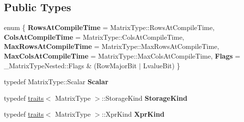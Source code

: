 \subsection*{Public Types}
\begin{DoxyCompactItemize}
\item 
\mbox{\label{struct_eigen_1_1internal_1_1traits_3_01_reverse_3_01_matrix_type_00_01_direction_01_4_01_4_a7819d7c8ce2baa03169cc94ffac98492}} 
enum \{ \newline
{\bfseries Rows\+At\+Compile\+Time} = Matrix\+Type\+::Rows\+At\+Compile\+Time, 
{\bfseries Cols\+At\+Compile\+Time} = Matrix\+Type\+::Cols\+At\+Compile\+Time, 
{\bfseries Max\+Rows\+At\+Compile\+Time} = Matrix\+Type\+::Max\+Rows\+At\+Compile\+Time, 
{\bfseries Max\+Cols\+At\+Compile\+Time} = Matrix\+Type\+::Max\+Cols\+At\+Compile\+Time, 
\newline
{\bfseries Flags} = \+\_\+\+Matrix\+Type\+Nested\+::Flags \& (Row\+Major\+Bit $\vert$ Lvalue\+Bit)
 \}
\item 
\mbox{\label{struct_eigen_1_1internal_1_1traits_3_01_reverse_3_01_matrix_type_00_01_direction_01_4_01_4_ac5be0e9568d9607bcb0a7c1730b3d012}} 
typedef Matrix\+Type\+::\+Scalar {\bfseries Scalar}
\item 
\mbox{\label{struct_eigen_1_1internal_1_1traits_3_01_reverse_3_01_matrix_type_00_01_direction_01_4_01_4_a1a9e576ce2d866a919ff6f333673fc14}} 
typedef \mbox{\hyperlink{struct_eigen_1_1internal_1_1traits}{traits}}$<$ Matrix\+Type $>$\+::Storage\+Kind {\bfseries Storage\+Kind}
\item 
\mbox{\label{struct_eigen_1_1internal_1_1traits_3_01_reverse_3_01_matrix_type_00_01_direction_01_4_01_4_a661e935d2f1281c8872523d6d81dabfe}} 
typedef \mbox{\hyperlink{struct_eigen_1_1internal_1_1traits}{traits}}$<$ Matrix\+Type $>$\+::Xpr\+Kind {\bfseries Xpr\+Kind}
\item 
\mbox{\label{struct_eigen_1_1internal_1_1traits_3_01_reverse_3_01_matrix_type_00_01_direction_01_4_01_4_a29a753d24c5bd3262a9b5aa1ae177e52}} 

\end{DoxyCompactItemize}
